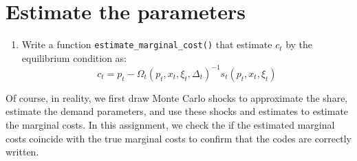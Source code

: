 \documentclass[
]{book}
\newenvironment{Shaded}{\begin{snugshade}}{\end{snugshade}}
\newcommand{\AttributeTok}[1]{\textcolor[rgb]{0.77,0.63,0.00}{#1}}
\newcommand{\CommentTok}[1]{\textcolor[rgb]{0.56,0.35,0.01}{\textit{#1}}}
\newcommand{\ControlFlowTok}[1]{\textcolor[rgb]{0.13,0.29,0.53}{\textbf{#1}}}
\newcommand{\DecValTok}[1]{\textcolor[rgb]{0.00,0.00,0.81}{#1}}
\newcommand{\FloatTok}[1]{\textcolor[rgb]{0.00,0.00,0.81}{#1}}
\newcommand{\FunctionTok}[1]{\textcolor[rgb]{0.00,0.00,0.00}{#1}}
\newcommand{\NormalTok}[1]{#1}
\newcommand{\OtherTok}[1]{\textcolor[rgb]{0.56,0.35,0.01}{#1}}
\newcommand{\SpecialCharTok}[1]{\textcolor[rgb]{0.00,0.00,0.00}{#1}}
\newcommand{\StringTok}[1]{\textcolor[rgb]{0.31,0.60,0.02}{#1}}
\providecommand{\tightlist}{%
  \setlength{\itemsep}{0pt}\setlength{\parskip}{0pt}}
\begin{document}
\begin{Shaded}
\end{Shaded}

\hypertarget{estimate-the-parameters-3}{%
\section{Estimate the parameters}\label{estimate-the-parameters-3}}

\begin{enumerate}
\def\labelenumi{\arabic{enumi}.}
\tightlist
\item
  Write a function \texttt{estimate\_marginal\_cost()} that estimate \(c_t\) by the equilibrium condition as:
  \[
  c_t = p_t - \Omega_t(p_t, x_t, \xi_t, \Delta_t)^{-1} s_t(p_t, x_t, \xi_t)
  \]
\end{enumerate}

Of course, in reality, we first draw Monte Carlo shocks to approximate the share, estimate the demand parameters, and use these shocks and estimates to estimate the marginal costs. In this assignment, we check the if the estimated marginal costs coincide with the true marginal costs to confirm that the codes are correctly written.
\end{document}
